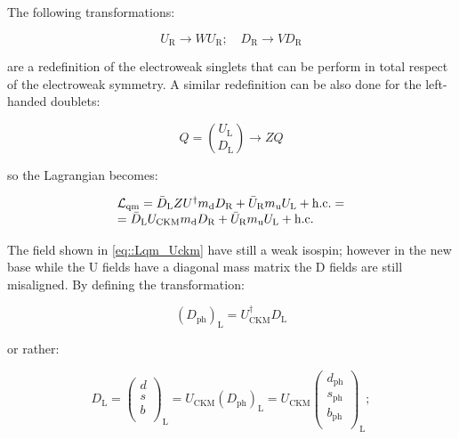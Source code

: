 The following transformations:

\begin{equation}
U_{\text{R}} \longrightarrow W U_{\text{R}}; \quad D_{\text{R}} \longrightarrow V D_{\text{R}}
\end{equation}

are a redefinition of the electroweak singlets that can be perform in total respect of the electroweak symmetry. A similar redefinition can be also done for the left-handed doublets:

\begin{equation}
Q = \binom{U_{\text{L}}}{D_{\text{L}}} \longrightarrow ZQ
\end{equation}

so the Lagrangian becomes:

\begin{equation}
\begin{array}{l c l}
\mathcal{L}_{\text{qm}} = \bar{D}_{\text{L}}ZU^{\dagger}m_{\text{d}}D_{\text{R}} + \bar{U}_{\text{R}}m_{\text{u}}U_{\text{L}} + \text{h.c.} = \\
= \bar{D}_{\text{L}}U_{\text{CKM}}m_{\text{d}}D_{\text{R}} + \bar{U}_{\text{R}}m_{\text{u}}U_{\text{L}} + \text{h.c.}
\label{eq::Lqm_Uckm}
\end{array}
\end{equation}

The field shown in \autoref{eq::Lqm_Uckm} have still a weak isospin; however in the new base while the U fields have a diagonal mass matrix the D fields are still misaligned. By defining the transformation:

\begin{equation}
\left(D_{\text{ph}}\right)_{\text{L}} = U^{\dagger}_{\text{CKM}}D_{\text{L}}
\end{equation}

or rather:

\begin{equation}
D_{\text{L}} = 
\begin{pmatrix}
d  \\
s  \\
b \\
\end{pmatrix}
_{\text{L}} =
U_{\text{CKM}}\left(D_{\text{ph}}\right)_{\text{L}} = U_{\text{CKM}}
\begin{pmatrix}
d_{\text{ph}}  \\
s_{\text{ph}}  \\
b_{\text{ph}} \\
\end{pmatrix}
_{\text{L}} ;
\end{equation}

